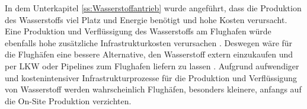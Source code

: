 In dem Unterkapitel \ref{ss:Wasserstoffantrieb} wurde angeführt, 
dass die Produktion des Wasserstoffs viel Platz und Energie benötigt und hohe Kosten verursacht. 
Eine Produktion und Verflüssigung des Wasserstoffs am Flughafen würde 
ebenfalls hohe zusätzliche Infrastrukturkosten verursachen \cite{dalmia2022powering}.
Deswegen wäre für die Flughäfen eine bessere Alternative, den Wasserstoff extern einzukaufen 
und per LKW oder Pipelines zum Flughafen liefern zu lassen \cite{gu2023hydrogen}.
Aufgrund aufwendiger und kostenintensiver Infrastrukturprozesse für die Produktion 
und Verflüssigung von Wasserstoff werden wahrscheinlich Flughäfen, 
besonders kleinere, anfangs auf die \glqq On-Site\grqq{} Produktion verzichten.

%
%

